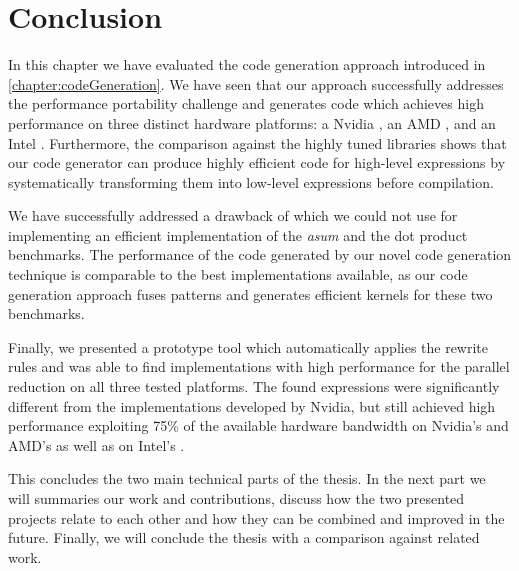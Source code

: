 \section{Conclusion}

In this chapter we have evaluated the code generation approach introduced in \autoref{chapter:codeGeneration}.
We have seen that our approach successfully addresses the performance portability challenge and generates code which achieves high performance on three distinct hardware platforms: a Nvidia \GPU, an AMD \GPU, and an Intel \CPU.
Furthermore, the comparison against the highly tuned \BLAS libraries shows that our code generator can produce highly efficient code for high-level expressions by systematically transforming them into low-level expressions before compilation.

We have successfully addressed a drawback of \SkelCL which we could not use for implementing an efficient implementation of the \emph{asum} and the dot product benchmarks.
The performance of the code generated by our novel code generation technique is comparable to the best implementations available, as our code generation approach fuses patterns and generates efficient kernels for these two benchmarks.

Finally, we presented a prototype tool which automatically applies the rewrite rules and was able to find implementations with high performance for the parallel reduction on all three tested platforms.
The found expressions were significantly different from the implementations developed by Nvidia, but still achieved high performance exploiting 75\% of the available hardware bandwidth on Nvidia's and AMD's \GPUs as well as on Intel's \CPU.

\bigskip

This concludes the two main technical parts of the thesis.
In the next part we will summaries our work and contributions, discuss how the two presented projects relate to each other and how they can be combined and improved in the future.
Finally, we will conclude the thesis with a comparison against related work.

